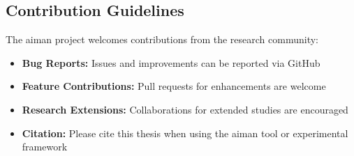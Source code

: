 \subsection{Contribution Guidelines}
The aiman project welcomes contributions from the research community:

\begin{itemize}
	\item \textbf{Bug Reports:} Issues and improvements can be reported via GitHub
	\item \textbf{Feature Contributions:} Pull requests for enhancements are welcome
	\item \textbf{Research Extensions:} Collaborations for extended studies are encouraged
	\item \textbf{Citation:} Please cite this thesis when using the aiman tool or experimental framework
\end{itemize} 